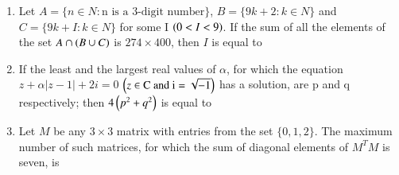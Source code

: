 \documentclass[journal,12pt,twocolumn]{IEEEtran}
\theoremstyle{remark}
\begin{document}
\begin{enumerate}
\bigskip
\item Let $A=\{n\in N: \text{n is a 3-digit number}\}$, $B=\{9k+2: k\in N\}$ and $C=\{9k+I:k\in N\}$ for some I $\left(0<I<9\right)$. If the sum of all the elements of the set $A\cap\left(B\cup C\right)$ is $274\times400$, then $I$ is equal to 
\bigskip
\item If the least and the largest real values of $\alpha$, for which the equation $z+\alpha|z-1|+2i=0$ $\left(z \in\text{C and i}=\sqrt{-1}\right)$ has a solution, are p and q respectively; then $4\left(p^2+q^2\right)$ is equal to 
\bigskip
\item Let $M$ be any $3\times3 $ matrix with entries from the set $\{0,1,2\}$. The maximum number of such matrices, for which the sum of diagonal elements of $M^TM$ is seven, is 
\bigskip
\end{enumerate}
\end{document}
